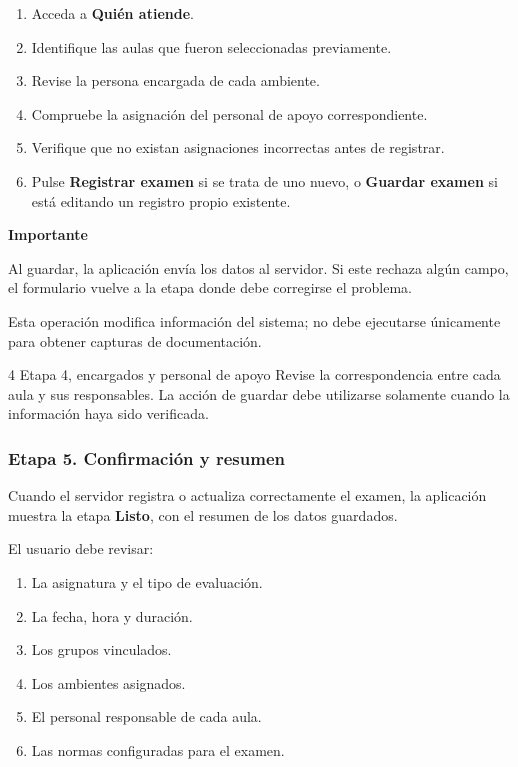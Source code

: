 \begin{enumerate}
    \item Acceda a \textbf{Quién atiende}.

    \item Identifique las aulas que fueron
    seleccionadas previamente.

    \item Revise la persona encargada de
    cada ambiente.

    \item Compruebe la asignación del personal
    de apoyo correspondiente.

    \item Verifique que no existan asignaciones
    incorrectas antes de registrar.

    \item Pulse \textbf{Registrar examen}
    si se trata de uno nuevo, o
    \textbf{Guardar examen} si está editando
    un registro propio existente.
\end{enumerate}

\noindent\textbf{Importante}

Al guardar, la aplicación envía los datos al
servidor. Si este rechaza algún campo, el
formulario vuelve a la etapa donde debe
corregirse el problema.

Esta operación modifica información del sistema;
no debe ejecutarse únicamente para obtener
capturas de documentación.

\CapturasRegistro
{4}
{Etapa 4, encargados y personal de apoyo}
{Revise la correspondencia entre cada aula
y sus responsables. La acción de guardar
debe utilizarse solamente cuando la información
haya sido verificada.}


\subsubsection{Etapa 5. Confirmación y resumen}

Cuando el servidor registra o actualiza
correctamente el examen, la aplicación muestra
la etapa \textbf{Listo}, con el resumen de
los datos guardados.

El usuario debe revisar:

\begin{enumerate}
    \item La asignatura y el tipo de evaluación.
    \item La fecha, hora y duración.
    \item Los grupos vinculados.
    \item Los ambientes asignados.
    \item El personal responsable de cada aula.
    \item Las normas configuradas para el examen.
\end{enumerate}

